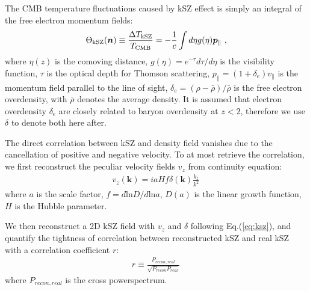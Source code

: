 \label{sec:kszRecon}
The CMB temperature fluctuations caused by kSZ effect is simply an integral of the 
free electron momentum fields:
\begin{eqnarray}
\label{eq:ksz}
\Theta_\mathrm{kSZ}(\bm{n})\equiv\frac{\Delta T_\mathrm{kSZ}}{T_{\mathrm{CMB}}}
=-\frac{1}{c}\int d\eta  g(\eta)  \bm{p}_\parallel\ ,
\end{eqnarray}
where $\eta(z)$ is the comoving distance, 
$g(\eta)=e^{-\tau} d\tau/d\eta$ is the visibility function, $\tau$ is the optical depth for Thomson scattering, 
$p_\parallel=(1+\delta_e)v_\parallel$ 
is the momentum field parallel to the line of sight, 
$\delta_e=(\rho-\bar{\rho})/\bar{\rho}$ 
is the free electron overdensity, 
with $\bar\rho$ denotes the average density. 
It is assumed that electron overdensity $\delta_e$ are closely 
related to baryon overdensity at $z<2$, 
therefore we use $\delta$ to denote both here after. 

The direct correlation between kSZ and density field vanishes due to the cancellation of positive and negative velocity.
To at most retrieve the correlation,  
we first reconstruct the peculiar velocity fields $v_z$ 
from continuity equation:
\begin{eqnarray}
	\label{eq:v}
v_z(\bm{k})=i a H f\delta(\bm{k})\frac{k_z}{k^2}\,
\end{eqnarray}
where $a$ is the scale factor, $f=d\mathrm{ln}D/d\mathrm{ln}a$, $D(a)$ is the linear growth function, 
$H$ is the Hubble parameter.

We then reconstruct a 2D kSZ field with $v_z$ and $\delta$ 
following Eq.(\ref{eq:ksz}), 
and quantify the tightness of correlation between reconstructed kSZ and real kSZ 
with a correlation coefficient $r$: 
\begin{eqnarray}
\label{eq:r}
	r\equiv \frac{P_{recon,real}}{\sqrt{P_{recon}P_{real}}}\,
\end{eqnarray}
where $P_{recon,real}$ is the cross powerspectrum.

